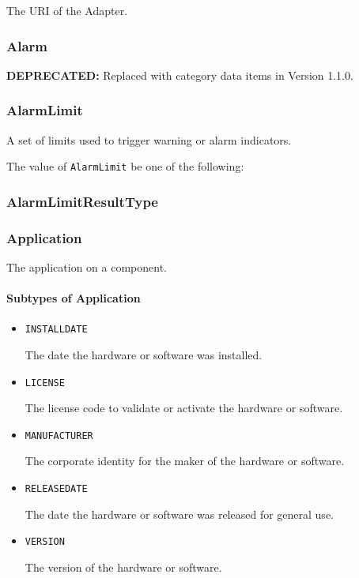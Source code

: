 The \gls{URI} of the \gls{Adapter}.


\subsubsection{Alarm}
\label{sec:Alarm}



\textbf{DEPRECATED:} Replaced with  category data items in Version 1.1.0.


\subsubsection{AlarmLimit}
\label{sec:AlarmLimit}



A set of limits used to trigger warning or alarm indicators.


The value of \texttt{AlarmLimit} \MUST be one of the following: 

\FloatBarrier

\subsubsection{AlarmLimitResultType}
\label{sec:AlarmLimitResultType}






\subsubsection{Application}
\label{sec:Application}



The application on a component.



\paragraph{Subtypes of Application}\mbox{}
\label{sec:Subtypes of Application}

\begin{itemize}

\item \texttt{INSTALL\textunderscore DATE}


The date the hardware or software was installed.

\item \texttt{LICENSE}


The license code to validate or activate the hardware or software.

\item \texttt{MANUFACTURER}


The corporate identity for the maker of the hardware or software.


\item \texttt{RELEASE\textunderscore DATE}


The date the hardware or software was released for general use.


\item \texttt{VERSION}


The version of the hardware or software.


\end{itemize}

